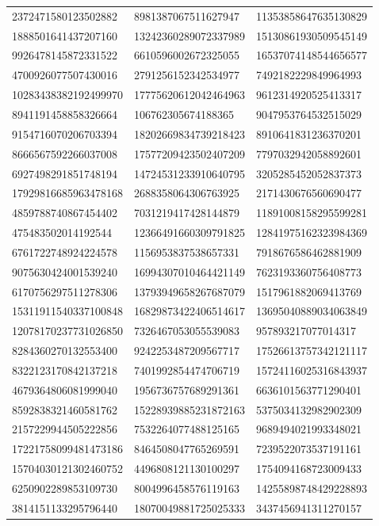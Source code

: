 \begin{longtable}{*{3}{l}}
2372471580123502882&8981387067511627947&11353858647635130829\\
1888501641437207160&13242360289072337989&15130861930509545149\\
9926478145872331522&6610596002672325055&16537074148544656577\\
4700926077507430016&2791256152342534977&7492182229849964993\\
10283438382192499970&17775620612042464963&9612314920525413317\\
8941191458858326664&106762305674188365&9047953764532515029\\
9154716070206703394&18202669834739218423&8910641831236370201\\
8666567592266037008&17577209423502407209&7797032942058892601\\
6927498291851748194&14724531233910640795&3205285452052837373\\
17929816685963478168&2688358064306763925&2171430676560690477\\
4859788740867454402&7031219417428144879&11891008158295599281\\
475483502014192544&12366491660309791825&12841975162323984369\\
6761722748924224578&1156953837538657331&7918676586462881909\\
9075630424001539240&16994307010464421149&7623193360756408773\\
6170756297511278306&13793949658267687079&1517961882069413769\\
15311911540337100848&16829873422406514617&13695040889034063849\\
12078170237731026850&7326467053055539083&957893217077014317\\
8284360270132553400&9242253487209567717&17526613757342121117\\
8322123170842137218&7401992854474706719&15724116025316843937\\
4679364806081999040&1956736757689291361&6636101563771290401\\
8592838321460581762&15228939885231872163&5375034132982902309\\
2157229944505222856&7532264077488125165&9689494021993348021\\
17221758099481473186&8464508047765269591&7239522073537191161\\
15704030121302460752&4496808121130100297&1754094168723009433\\
6250902289853109730&8004996458576119163&14255898748429228893\\
3814151133295796440&18070049881725025333&3437456941311270157\\

\end{longtable}
